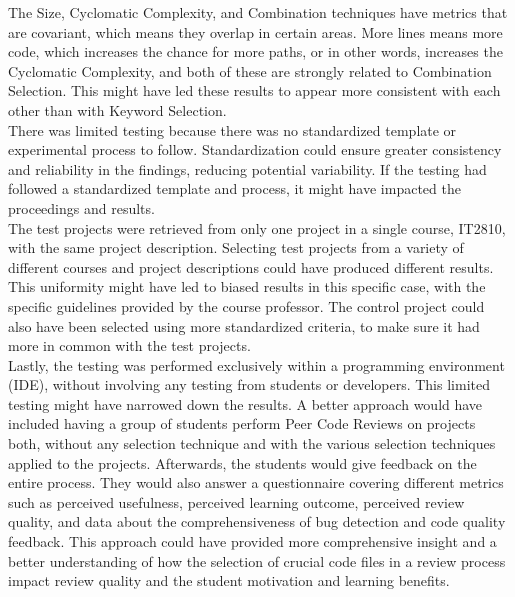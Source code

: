 The Size, Cyclomatic Complexity, and Combination techniques have metrics that are covariant, which means they overlap in certain areas. More lines means more code, which increases the chance for more paths, or in other words, increases the Cyclomatic Complexity, and both of these are strongly related to Combination Selection.  This might have led these results to appear more consistent with each other than with Keyword Selection. \\

There was limited testing because there was no standardized template or experimental process to follow. Standardization could ensure greater consistency and reliability in the findings, reducing potential variability. If the testing had followed a standardized template and process, it might have impacted the proceedings and results. \\

The test projects were retrieved from only one project in a single course, IT2810, with the same project description. Selecting test projects from a variety of different courses and project descriptions could have produced different results. This uniformity might have led to biased results in this specific case, with the specific guidelines provided by the course professor. The control project could also have been selected using more standardized criteria, to make sure it had more in common with the test projects.\\

Lastly, the testing was performed exclusively within a programming environment (IDE), without involving any testing from students or developers. This limited testing might have narrowed down the results. A better approach would have included having a group of students perform Peer Code Reviews on projects both, without any selection technique and with the various selection techniques applied to the projects. Afterwards, the students would give feedback on the entire process. They would also answer a questionnaire covering different metrics such as perceived usefulness, perceived learning outcome, perceived review quality, and data about the comprehensiveness of bug detection and code quality feedback. This approach could have provided more comprehensive insight and a better understanding of how the selection of crucial code files in a review process impact review quality and the student motivation and learning benefits.


